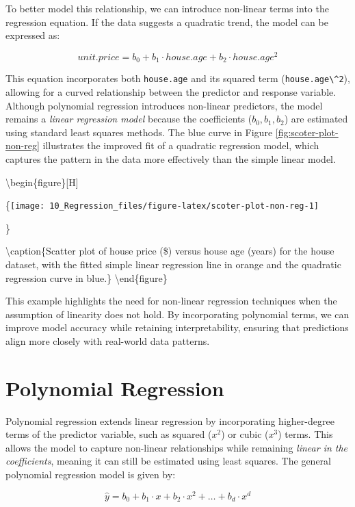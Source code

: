 \documentclass[
  11pt,
]{book}
\newcommand{\passthrough}[1]{#1}
\theoremstyle{definition}
\theoremstyle{definition}
\theoremstyle{definition}
\theoremstyle{definition}
\theoremstyle{remark}
\begin{document}
To better model this relationship, we can introduce non-linear terms into the regression equation. If the data suggests a quadratic trend, the model can be expressed as:

\[
unit.price = b_0 + b_1 \cdot house.age + b_2 \cdot house.age^2
\]

This equation incorporates both \passthrough{\lstinline!house.age!} and its squared term (\passthrough{\lstinline!house.age\^2!}), allowing for a curved relationship between the predictor and response variable. Although polynomial regression introduces non-linear predictors, the model remains a \emph{linear regression model} because the coefficients (\(b_0, b_1, b_2\)) are estimated using standard least squares methods. The blue curve in Figure \ref{fig:scoter-plot-non-reg} illustrates the improved fit of a quadratic regression model, which captures the pattern in the data more effectively than the simple linear model.

\textbackslash begin\{figure\}{[}H{]}

\{\centering \texttt{[image: 10\_Regression\_files/figure-latex/scoter-plot-non-reg-1]}

\}

\textbackslash caption\{Scatter plot of house price (\$) versus house age (years) for the house dataset, with the fitted simple linear regression line in orange and the quadratic regression curve in blue.\}\label{fig:scoter-plot-non-reg}
\textbackslash end\{figure\}

This example highlights the need for non-linear regression techniques when the assumption of linearity does not hold. By incorporating polynomial terms, we can improve model accuracy while retaining interpretability, ensuring that predictions align more closely with real-world data patterns.

\section{Polynomial Regression}\label{polynomial-regression}

Polynomial regression extends linear regression by incorporating higher-degree terms of the predictor variable, such as squared (\(x^2\)) or cubic (\(x^3\)) terms. This allows the model to capture non-linear relationships while remaining \emph{linear in the coefficients}, meaning it can still be estimated using least squares. The general polynomial regression model is given by:

\[
\hat{y} = b_0 + b_1 \cdot x + b_2 \cdot x^2 + \dots + b_d \cdot x^d
\]
\end{document}
